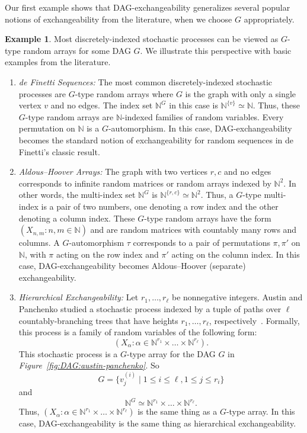 \documentclass[10pt]{amsart}
\theoremstyle{definition}\newtheorem{defi}[theo]{Definition}\newtheorem{rema}[theo]{Remark}\newtheorem{exam}[theo]{Example}\newtheorem{exem}[theo]{Example}\newtheorem{nota}[theo]{Notation}
\newcommand{\alf}{\alpha}%
\newcommand{\indices}[1]{\mathbb{N}^{#1}}
\newcommand*\N{\mathbb{N}}
\newcommand*{\alphenumi}{\renewcommand*{\theenumi}{\alph{enumi}}}
\begin{document}
Our first example shows that DAG-exchangeability generalizes several popular notions of exchangeability from the literature, when we choose $G$ appropriately.

\begin{exam}\label{ex:known}
Most discretely-indexed stochastic processes can be viewed as $G$-type random arrays for some DAG $G$. We illustrate this perspective with basic examples from the literature.
\begin{enumerate}\alphenumi
\item \label{list2.1.1}\emph{de Finetti Sequences:} The most common discretely-indexed stochastic processes are $G$-type random arrays where $G$ is the graph with only a single vertex $v$ and no edges. The index set $\indices G$ in this case is $\mathbb{N}^{\{v\}} \simeq \mathbb{N}$. Thus, these $G$-type random arrays are $\mathbb{N}$-indexed families of random variables. Every permutation on $\mathbb{N}$ is a $G$-automorphism. In this case, DAG-exchangeability becomes the standard notion of exchangeability for random sequences in de Finetti's classic result.

\item \label{list2.1.2}\emph{Aldous--Hoover Arrays:} The graph with two vertices ${r,c}$ and no edges corresponds to infinite random matrices or random arrays indexed by $\N^2$. In other words, the multi-index set $\indices G$ is $\mathbb{N}^{\{r,c\}} \simeq \mathbb{N}^2$. Thus, a $G$-type multi-index is a pair of two numbers, one denoting a row index and the other denoting a column index. These $G$-type random arrays have the form $(X_{n,m} : n,m \in \mathbb{N})$ and are random matrices with countably many rows and columns. {A $G$-automorphism $\tau$ corresponds to a pair of permutations $\pi,\pi'$ on $\mathbb{N}$, with $\pi$ acting on the row index and $\pi'$ acting on the column index.} In this case, DAG-exchangeability becomes Aldous--Hoover (separate) exchangeability.

\item \label{list2.1.3}\emph{Hierarchical Exchangeability:} Let $r_1,\ldots,r_\ell$ be nonnegative integers. Austin and Panchenko studied a stochastic process indexed by a tuple of paths over $\ell$ countably-branching trees that have heights $r_1,\ldots,r_\ell$, respectively~\cite{austin:panchenko:2014}. Formally, this process is a family of random variables of the following form:
\[
(X_\alf : \alf \in \mathbb{N}^{r_1} \times \ldots \times \mathbb{N}^{r_\ell}).
\]
This stochastic process is a $G$-type array for the DAG $G$ in \emph{Figure~\ref{fig:DAG:austin-panchenko}}. So
\[
G = {\{v^{(i)}_j \mid 1 \leq i \leq \ell, 1 \leq j \leq r_i\}}
\]
and
\[
\mathbb{N}^G
\simeq \mathbb{N}^{r_1} \times \ldots \times \mathbb{N}^{r_\ell}.
\]
Thus, $(X_\alf : \alf \in \mathbb{N}^{r_1} \times \ldots \times \mathbb{N}^{r_\ell})$ is the same thing as a $G$-type array. In this case, DAG-exchangeability is the same thing as hierarchical exchangeability.
\end{enumerate}
\end{exam}
\end{document}
